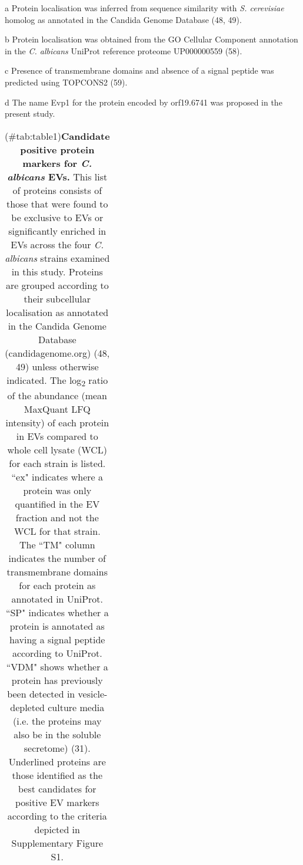 \begingroup\fontsize{8}{10}\selectfont

\begin{ThreePartTable}
\begin{TableNotes}
\item[a] Protein localisation was inferred from sequence 
                         similarity with \textit{S. cerevisiae} homolog as 
                         annotated in the Candida Genome Database (48, 49).
\item[b] Protein localisation was obtained from the GO Cellular
                        Component annotation in the \textit{C. albicans} 
                        UniProt reference proteome UP000000559 (58).
\item[c] Presence of transmembrane domains and absence of a 
                        signal peptide was predicted using TOPCONS2 (59).
\item[d] The name Evp1 for the protein encoded by orf19.6741 
                        was proposed in the present study.
\end{TableNotes}
\begin{longtable}[t]{lllllllll}
\caption{(\#tab:table1)\textbf{Candidate positive protein markers for 
             \textit{C. albicans} EVs.} This list of proteins consists of 
             those that were found to be exclusive to EVs or significantly 
             enriched in EVs across the four \textit{C. albicans} strains 
             examined in this study. Proteins are grouped according to their 
             subcellular localisation as annotated in the Candida Genome 
             Database (candidagenome.org) (48, 49) unless otherwise 
             indicated. The log\textsubscript{2} ratio of the abundance 
             (mean MaxQuant LFQ intensity) of each protein in EVs compared to 
             whole cell lysate (WCL) for each strain is listed. ``ex" 
             indicates where a protein was only quantified in the EV fraction 
             and not the WCL for that strain. The ``TM" column indicates the 
             number of transmembrane domains for each protein as annotated in 
             UniProt. ``SP" indicates whether a protein is annotated as 
             having a signal peptide according to UniProt. ``VDM" shows 
             whether a protein has previously been detected in vesicle-depleted 
             culture media (i.e. the proteins may also be in the soluble secretome) 
             (31). Underlined proteins are those identified as the 
             best candidates for positive EV markers according to the 
             criteria depicted in Supplementary Figure S1.}\\

\end{longtable}
\end{ThreePartTable}
